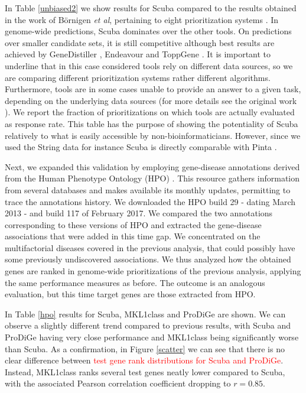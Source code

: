 \documentclass[twocolumn]{bmcart}%
\begin{document}
In Table \ref{unbiased2} we show results for Scuba compared to the results obtained in the work of B\"{o}rnigen \emph{et al}, pertaining to eight prioritization systems \cite{bornigen}. In genome-wide predictions, Scuba dominates over the other tools. On predictions over smaller candidate sets, it is still competitive although best results are achieved by GeneDistiller \cite{genedistiller}, Endeavour \cite{endeavour} and ToppGene \cite{toppgene}. It is important to underline that in this case considered tools rely on different data sources, so we are comparing different prioritization systems rather different algorithms. Furthermore, tools are in some cases unable to provide an answer to a given task, depending on the underlying data sources (for more details see the original work \cite{bornigen}). We report the fraction of prioritizations on which tools are actually evaluated as response rate. This table has the purpose of showing the potentiality of Scuba relatively to what is easily accessible by non-bioinformaticians. However, since we used the String data for instance Scuba is directly comparable with Pinta \cite{bornigen, pinta}.

Next, we expanded this validation by employing gene-disease annotations derived from the Human Phenotype Ontology (HPO) \cite{hpo}. This resource gathers information from several databases and makes available its monthly updates, permitting to trace the annotations history. We downloaded the HPO build 29 - dating March 2013 - and build 117 of February 2017. We compared the two annotations corresponding to these versions of HPO and extracted the gene-disease associations that were added in this time gap. We concentrated on the multifactorial diseases covered in the previous analysis, that could possibly have some previously undiscovered associations. We thus analyzed how the obtained genes are ranked in genome-wide prioritizations of the previous analysis, applying the same performance measures as before. The outcome is an analogous evaluation, but this time target genes are those extracted from HPO.
 
In Table \ref{hpo} results for Scuba, MKL1class and ProDiGe are shown. We can observe a slightly different trend compared to previous results, with Scuba and ProDiGe having very close performance and MKL1class being significantly worse than Scuba. As a confirmation, in Figure \ref{scatter} we can see that there is no clear difference between \textcolor{red}{test gene rank distributions for Scuba and ProDiGe}. Instead, MKL1class ranks several test genes neatly lower compared to Scuba, with the associated Pearson correlation coefficient dropping to $r=0.85$.
\end{document}
